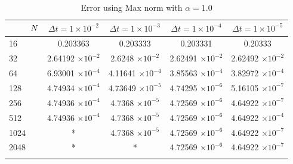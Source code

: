 \begin{table}[H]
\begin{tabular}{lcccc}
			$\hspace{9mm}N$ & $\Delta t=1\times 10^{-2}$ & $\Delta t=1\times 10^{-3}$ & $\Delta t=1\times 10^{-4}$ & $\Delta t=1\times 10^{-5}$ \\
			\midrule
			\hspace{7mm} 16 & 0.203363    & 0.203333    & 0.203331    & 0.20333     \\
			\midrule
			\hspace{7mm} 32 & 2.64192 $\times 10 ^{-2}$   & 2.6248 $\times 10 ^{-2}$    & 2.62491 $\times 10 ^{-2}$  & 2.62492 $\times 10 ^{-2}$   \\
			\midrule
			\hspace{7mm} 64 & 6.93001 $\times 10 ^{-4}$ & 4.11641 $\times 10 ^{-4}$ & 3.85563 $\times 10 ^{-4}$ & 3.82972 $\times 10 ^{-4}$ \\
			\midrule
			\hspace{7mm} 128 & 4.74934 $\times 10 ^{-4}$ & 4.73649 $\times 10 ^{-5}$ & 4.74295 $\times 10 ^{-6}$ & 5.16105 $\times 10 ^{-7}$ \\
			\midrule
			\hspace{7mm} 256 & 4.74936 $\times 10 ^{-4}$ & 4.7368 $\times 10 ^{-5}$  & 4.72569 $\times 10 ^{-6}$ & 4.64922 $\times 10 ^{-7}$ \\
			\midrule
			\hspace{7mm} 512 & 4.74936 $\times 10 ^{-4}$ & 4.7368 $\times 10 ^{-5}$  & 4.72569 $\times 10 ^{-6}$ & 4.64922 $\times 10 ^{-4}$ \\
			\midrule
			\hspace{7mm} 1024 & * & 4.7368 $\times 10 ^{-5}$  & 4.72569 $\times 10 ^{-6}$ & 4.64922 $\times 10 ^{-7}$ \\
			\midrule
			\hspace{7mm} 2048 & * & * & 4.72569 $\times 10 ^{-6}$ & 4.64922 $\times 10 ^{-7}$ \\
			\\
			\bottomrule
		\end{tabular}
		\caption{Error using Max norm with $\alpha = 1.0$}
		\label{Galerkin_tabla_max_alpha=1}
	\end{table}

